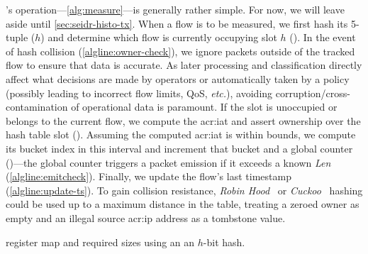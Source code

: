 \seidr{}'s operation---\cref{alg:measure}---is generally rather simple.
For now, we will leave aside  until \cref{sec:seidr-histo-tx}.
When a flow is to be measured, we first hash its 5-tuple ($h$) and determine which flow is currently occupying slot $h$ ().
In the event of hash collision (\cref{algline:owner-check}), we ignore packets outside of the tracked flow to ensure that data is accurate.
As later processing and classification directly affect what decisions are made by operators or automatically taken by a policy (possibly leading to incorrect flow limits, QoS, \emph{etc.}), avoiding corruption/cross-contamination of operational data is paramount.
If the slot is unoccupied or belongs to the current flow, we compute the \gls{acr:iat} and assert ownership over the hash table slot ().
Assuming the computed \gls{acr:iat} is within bounds, we compute its bucket index in this interval and increment that bucket and a global counter ()---the global counter triggers a packet emission if it exceeds a known \emph{Len} (\cref{algline:emitcheck}).
Finally, we update the flow's last timestamp (\cref{algline:update-ts}).
To gain collision resistance, \emph{Robin Hood}~\parencite{DBLP:conf/focs/CelisLM85} or \emph{Cuckoo}~\parencite{DBLP:conf/esa/PaghR01} hashing could be used up to a maximum distance in the table, treating a zeroed owner as empty and an illegal source \gls{acr:ip} address as a tombstone value.

\begin{table}
    \centering
    \caption{\seidr{} register map and required sizes using an an $h$-bit hash.}
    \label{tab:registers}
\end{table}


